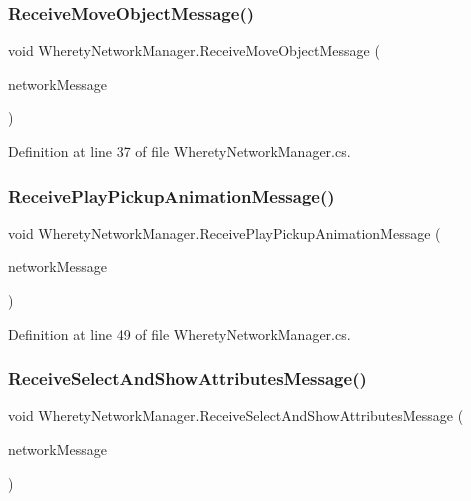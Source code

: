 \subsubsection{\texorpdfstring{ReceiveMoveObjectMessage()}{ReceiveMoveObjectMessage()}}
{\footnotesize\ttfamily void Wherety\+Network\+Manager.\+Receive\+Move\+Object\+Message (\begin{DoxyParamCaption}\item[{Network\+Message}]{network\+Message }\end{DoxyParamCaption})}



Definition at line 37 of file Wherety\+Network\+Manager.\+cs.

\mbox{\label{class_wherety_network_manager_a5f80307ac75bac2c91c9d856f9599fc3}} 
\subsubsection{\texorpdfstring{ReceivePlayPickupAnimationMessage()}{ReceivePlayPickupAnimationMessage()}}
{\footnotesize\ttfamily void Wherety\+Network\+Manager.\+Receive\+Play\+Pickup\+Animation\+Message (\begin{DoxyParamCaption}\item[{Network\+Message}]{network\+Message }\end{DoxyParamCaption})}



Definition at line 49 of file Wherety\+Network\+Manager.\+cs.

\mbox{\label{class_wherety_network_manager_a474f4d25df96e54eaa17593694ed8c2d}} 
\subsubsection{\texorpdfstring{ReceiveSelectAndShowAttributesMessage()}{ReceiveSelectAndShowAttributesMessage()}}
{\footnotesize\ttfamily void Wherety\+Network\+Manager.\+Receive\+Select\+And\+Show\+Attributes\+Message (\begin{DoxyParamCaption}\item[{Network\+Message}]{network\+Message }\end{DoxyParamCaption})}



